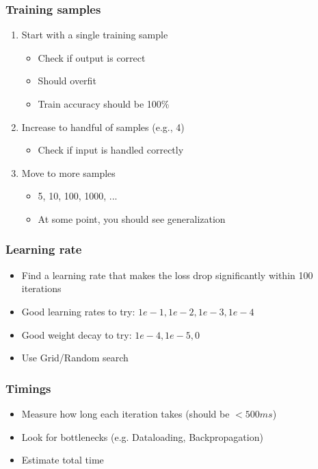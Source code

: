 \documentclass[10pt,a4paper]{article}
\begin{document}
\subsubsection{Training samples}
\begin{enumerate}
	\item Start with a single training sample
	\begin{itemize}
		\item Check if output is correct
		\item Should overfit
		\item Train accuracy should be 100\%
	\end{itemize}
	\item Increase to handful of samples (e.g., 4)
	\begin{itemize}
		\item Check if input is handled correctly
	\end{itemize}
	\item Move to more samples
	\begin{itemize}
		\item 5, 10, 100, 1000, ...
		\item At some point, you should see generalization
	\end{itemize}
\end{enumerate}

\subsubsection{Learning rate}
\begin{itemize}
	\item Find a learning rate that makes the loss drop significantly within 100 iterations
	\item Good learning rates to try: $1e-1, 1e-2, 1e-3, 1e-4$
	\item Good weight decay to try: $1e-4, 1e-5, 0$
	\item Use Grid/Random search
\end{itemize}

\subsubsection{Timings}
\begin{itemize}
	\item Measure how long each iteration takes (should be $< 500 ms$)
	\item Look for bottlenecks (e.g. Dataloading, Backpropagation)
	\item Estimate total time
\end{itemize}
\end{document}
